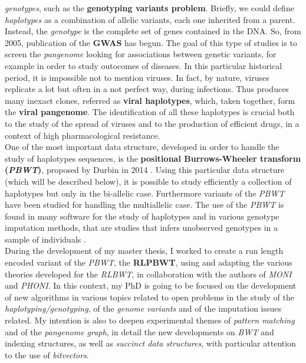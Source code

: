 \documentclass[a4paper,11pt, oneside]{article}
\begin{document}
\textit{genotypes}, such as the \textbf{genotyping variants
  problem}. Briefly, we could define \textit{haplotypes} as a combination 
of allelic variants, each one inherited from a parent. Instead, the
\textit{genotype} is the complete set of genes contained in the DNA. So, from
2005, publication of the \textbf{GWAS} has begun. The goal of this type of
studies is to screen the  
\textit{pangenome} looking for associations between genetic variants, for
example in order to study outocomes of diseases.
In this particular historical period, it is impossible not to mention
viruses. In fact, by nature, viruses replicate a lot but
often in a not perfect way, during infections. Thus produces many inexact
clones, referred as 
\textbf{viral haplotypes}, which, taken together, form the \textbf{viral
  pangenome}. The identification of all these haplotypes is crucial both to the
study of the spread of viruses and to the production of efficient
drugs, in a context of high pharmacological resistance. \\
One of the most important data structure, developed in order to handle the study
of haplotypes sequences, is the \textbf{positional Burrows-Wheeler transform
  (\textit{PBWT})}, proposed by Durbin in 2014 \cite{pbwt_durbin}. Using this
particular data structure (which will be described below), it is possible to
study efficiently a collection of haplotypes but only in the bi-allelic
case. Furthermore variants of the \textit{PBWT} have been studied for
handling the multiallelic case. The use of the \textit{PBWT} is found in many
software for the study of haplotypes and in various genotype imputation methods,
that are studies that infers unobserved genotypes in a sample of individuals
\cite{impute5}.\\
During the development of my master thesis, I worked to create a run length
encoded variant of the \textit{PBWT}, the \textbf{RLPBWT}, using and adapting
the various theories developed for the \textit{RLBWT}, in collaboration with the
authors of \textit{MONI} and \textit{PHONI}. In this context, my PhD
is going to be focused on the development of new algorithms in
various topics related to open problems in the study of the
\textit{haplotyping/genotyping}, of the \textit{genome 
  variants} and of the imputation issues related. My intention is also to deepen
experimental themes  
of \textit{pattern matching} and of the \textit{pangenome graph}, in detail the
new developments on \textit{BWT} and indexing structures, as well as
\textit{succinct data structures}, with particular attention to the use of
\textit{bitvectors}.
\end{document}
